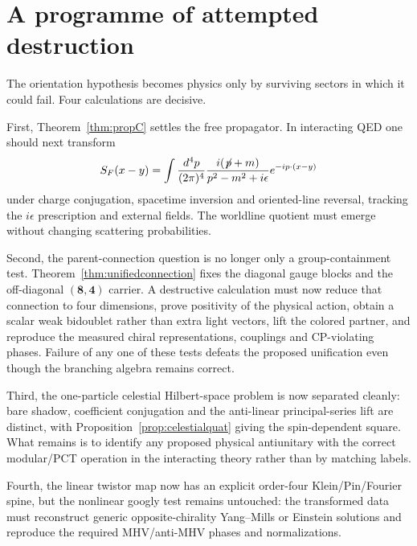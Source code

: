\documentclass[11pt]{article}
\theoremstyle{definition}\newtheorem{definition}[theorem]{Definition}
\theoremstyle{remark}\newtheorem{remark}[theorem]{Remark}\newtheorem{conjecture}[theorem]{Conjecture}
\begin{document}
\section{A programme of attempted destruction}
The orientation hypothesis becomes physics only by surviving sectors in which it could fail. Four calculations are decisive.

First, Theorem~\ref{thm:propC} settles the free propagator. In interacting QED one should next transform
\begin{equation}
 S_F(x-y)=\int\frac{d^4p}{(2\pi)^4}
 \frac{i(\not\!p+m)}{p^2-m^2+i\epsilon}e^{-ip\cdot(x-y)}
\end{equation}
under charge conjugation, spacetime inversion and oriented-line reversal, tracking the $i\epsilon$ prescription and external fields. The worldline quotient must emerge without changing scattering probabilities.

Second, the parent-connection question is no longer only a group-containment test. Theorem~\ref{thm:unifiedconnection} fixes the diagonal gauge blocks and the off-diagonal $(\mathbf8,\mathbf4)$ carrier. A destructive calculation must now reduce that connection to four dimensions, prove positivity of the physical action, obtain a scalar weak bidoublet rather than extra light vectors, lift the colored partner, and reproduce the measured chiral representations, couplings and CP-violating phases. Failure of any one of these tests defeats the proposed unification even though the branching algebra remains correct.

Third, the one-particle celestial Hilbert-space problem is now separated cleanly: bare shadow, coefficient conjugation and the anti-linear principal-series lift are distinct, with Proposition~\ref{prop:celestialquat} giving the spin-dependent square. What remains is to identify any proposed physical antiunitary with the correct modular/PCT operation in the interacting theory rather than by matching labels.

Fourth, the linear twistor map now has an explicit order-four Klein/Pin/Fourier spine, but the nonlinear googly test remains untouched: the transformed data must reconstruct generic opposite-chirality Yang--Mills or Einstein solutions and reproduce the required MHV/anti-MHV phases and normalizations.
\end{document}
